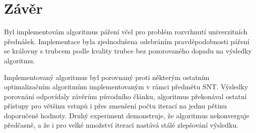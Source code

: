 \documentclass[12pt, a4paper]{article}
\begin{document}
\section{Závěr}
Byl implementovám algoritmus páření včel pro problém rozvrhnutí univerzitních přednášek.
Implementace byla zjednodušena odebráním prav\-dě\-po\-dob\-nos\-ti páření se královny s trubcem podle kvality trubce
bez pozorovaného dopadu na výsledky algoritmu.

Implementovaný algoritmus byl porovnaný proti některým ostatním optimalizačním algoritmům implementovaným v rámci předmětu SNT.
Výsledky porovnání odpovídaly zá\-vě\-rům původního článku, algoritmus překonával os\-tat\-ní přístupy pro většinu vstupů i přes zmenšení počtu iterací na jednu pětinu doporučené hodnoty.
Druhý experiment demonstruje, že algoritmus nekonverguje předčasně, a že i pro velké množství iterací nastává stálé zlep\-šo\-vá\-ní výsledku.

\makeatletter
    \def\@openbib@code{\addcontentsline{toc}{chapter}{Literatura}}

\begin{flushleft}
  
\end{flushleft}
\end{document}
